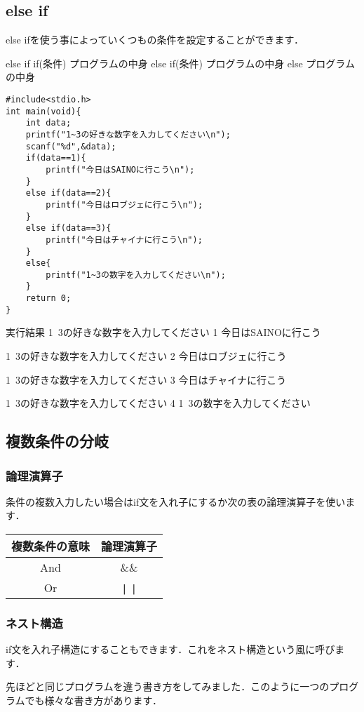 \documentclass[a4j,titlepage,dvipdfmx]{jsarticle}   %
\begin{document}
\subsection{else if}
else ifを使う事によっていくつもの条件を設定することができます．\\
\begin{itembox}{else if}
if(条件){
	プログラムの中身
}
else if(条件){
	プログラムの中身
}
else{
	プログラムの中身
}
\end{itembox}
\begin{lstlisting}
#include<stdio.h>
int main(void){
    int data;
    printf("1~3の好きな数字を入力してください\n");
    scanf("%d",&data);
    if(data==1){
    	printf("今日はSAINOに行こう\n");
    }
    else if(data==2){
    	printf("今日はロブジェに行こう\n");
    }
    else if(data==3){
    	printf("今日はチャイナに行こう\n");
    }
    else{
    	printf("1~3の数字を入力してください\n");
    }
    return 0;
}
\end{lstlisting}

\begin{itembox}{実行結果}
1~3の好きな数字を入力してください
1
今日はSAINOに行こう

1~3の好きな数字を入力してください
2
今日はロブジェに行こう

1~3の好きな数字を入力してください
3
今日はチャイナに行こう

1~3の好きな数字を入力してください
4
1~3の数字を入力してください
\end{itembox}

\subsection{複数条件の分岐}
\subsubsection{論理演算子}
条件の複数入力したい場合はif文を入れ子にするか次の表の論理演算子を使います．
\begin{table}[htb]
\begin{tabular}{|c|c|}
\hline
複数条件の意味 & \multicolumn{1}{l|}{論理演算子} \\ \hline
And     & \&\&                            \\ \hline
Or      & \verb+|+	\verb+|+                          \\ \hline
\end{tabular}
\end{table}

\subsubsection{ネスト構造}
if文を入れ子構造にすることもできます．これをネスト構造という風に呼びます．

先ほどと同じプログラムを違う書き方をしてみました．このように一つのプログラムでも様々な書き方があります．\\
\end{document}
